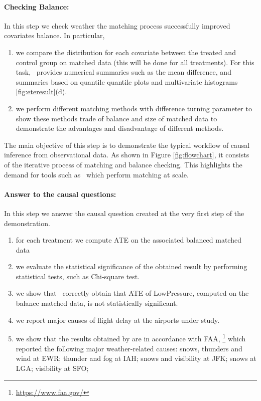 \paragraph{\bf Checking Balance:}  In this step we check weather the matching process  successfully improved covariates balance. In particular,
    \begin{enumerate}
      \item  we compare the distribution for each covariate between the treated and control group on matched data (this will be done for all treatments). For this task, \GSQL\  provides numerical summaries such as the mean difference, and summaries based on quantile quantile plots and multivariate histograms \ref{fig:eteresult}(d).

      \item  we perform different matching methods with difference turning parameter to show these methods trade of balance and size of matched data to demonstrate the advantages and disadvantage of different methods.
       \end{enumerate}
      The main objective of this step is to demonstrate the typical workflow of causal inference from observational data. As shown in Figure \ref{fig:flowchart}, it consists of the iterative process of matching and balance checking. This highlights the demand for tools such as \GSQL\, which perform matching at scale.

     \paragraph{\bf Answer to the causal questions:}  In this step  we answer the causal question created at the very first step of the demonstration. 
       \begin{enumerate}
       \item for each treatment we compute ATE on the associated balanced matched data
      \item we evaluate the statistical significance of the obtained result by performing statistical tests, such as Chi-square test.
    \item we show that \GSQL\ correctly obtain that ATE of LowPressure, computed on the balance matched data, is not statistically significant.
        \item we report major causes of flight delay at the airports under study.
    \item   we show that the results obtained by \GSQL are in accordance with 
FAA, \footnote{\url{https://www.faa.gov/}} which reported the following major weather-related
causes:
snows, thunders and wind at EWR; thunder and fog at IAH;
snows and visibility at JFK; snows at LGA; visibility at SFO;
 
        \end{enumerate}



